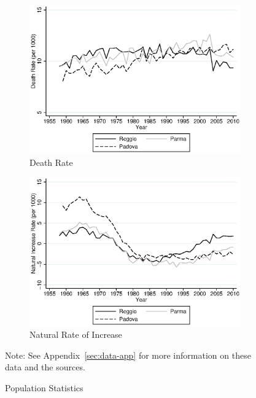 \begin{figure}[H]
\begin{center}
\begin{subfigure}[t]{0.49\textwidth}
          \includegraphics[width=\textwidth]{../../output/image/death_rate.eps}
        \caption{Death Rate}
        \end{subfigure}
        \begin{subfigure}[t]{0.49\textwidth}
          \includegraphics[width=\textwidth]{../../output/image/naturalinc_rate.eps}
            \caption{Natural Rate of Increase}
        \end{subfigure}
      \caption{Population Statistics}  \label{fig:population}
      \end{center}
      \raggedright Note: See Appendix~\ref{sec:data-app} for more information on these data and the sources.
    \end{figure}

